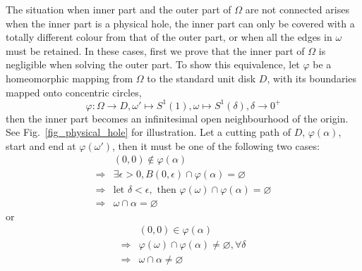 \documentclass[journal]{IEEEtran}
\begin{document}
The situation when inner part and the outer part of $\Omega$ are not connected arises when the inner part is a physical hole, 
the inner part can only be covered with a totally different colour from that of the outer part, or when all the edges in $\omega$ must be retained. 
In these cases, first we prove that the inner part of $\Omega$ is negligible when solving the outer part. 
To show this equivalence, let $\varphi$ be a homeomorphic mapping 
from $\Omega$ to the standard unit disk $D$, with its boundaries mapped onto concentric circles, 
\begin{equation}
\varphi: \Omega\rightarrow D, \omega'\mapsto S^1(1), \omega\mapsto S^1(\delta), \delta\rightarrow 0^+
\end{equation}
then the inner part becomes an infinitesimal open neighbourhood of the origin. See Fig.~\ref{fig_physical_hole} for illustration. 
Let a cutting path of $D$, $\varphi(\alpha)$, start and end at $\varphi(\omega')$, then it must be one of the following two cases:
\begin{equation}
\label{equ_nocross}
\begin{aligned}
&(0, 0)\notin \varphi(\alpha)\\
\Rightarrow &\exists \epsilon > 0, B(0, \epsilon) \cap \varphi(\alpha) = \varnothing\\
\Rightarrow &\mbox{let } \delta < \epsilon, \mbox{ then } \varphi(\omega)\cap \varphi(\alpha) = \varnothing\\
\Rightarrow & \omega\cap \alpha = \varnothing
\end{aligned}
\end{equation}
or 
\begin{equation}
\label{equ_cross}
\begin{aligned}
&(0, 0)\in \varphi(\alpha)\\
\Rightarrow &\varphi(\omega)\cap \varphi(\alpha) \neq \varnothing, \forall \delta\\
\Rightarrow & \omega\cap \alpha \neq \varnothing
\end{aligned}
\end{equation}

\end{document}
